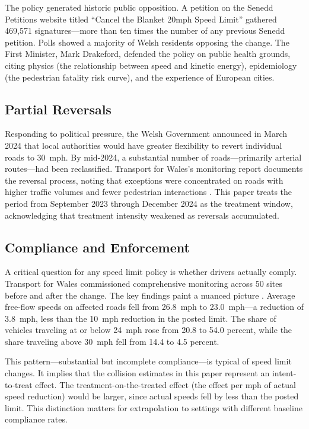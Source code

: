 \documentclass[12pt]{article}
\begin{document}
The policy generated historic public opposition. A petition on the Senedd Petitions website titled ``Cancel the Blanket 20mph Speed Limit'' gathered 469,571 signatures---more than ten times the number of any previous Senedd petition. Polls showed a majority of Welsh residents opposing the change. The First Minister, Mark Drakeford, defended the policy on public health grounds, citing physics (the relationship between speed and kinetic energy), epidemiology (the pedestrian fatality risk curve), and the experience of European cities.

\subsection{Partial Reversals}

Responding to political pressure, the Welsh Government announced in March 2024 that local authorities would have greater flexibility to revert individual roads to 30~mph. By mid-2024, a substantial number of roads---primarily arterial routes---had been reclassified. Transport for Wales's monitoring report documents the reversal process, noting that exceptions were concentrated on roads with higher traffic volumes and fewer pedestrian interactions \citep{tfw2025}. This paper treats the period from September 2023 through December 2024 as the treatment window, acknowledging that treatment intensity weakened as reversals accumulated.

\subsection{Compliance and Enforcement}

A critical question for any speed limit policy is whether drivers actually comply. Transport for Wales commissioned comprehensive monitoring across 50 sites before and after the change. The key findings paint a nuanced picture \citep{tfw2025}. Average free-flow speeds on affected roads fell from 26.8~mph to 23.0~mph---a reduction of 3.8~mph, less than the 10~mph reduction in the posted limit. The share of vehicles traveling at or below 24~mph rose from 20.8 to 54.0 percent, while the share traveling above 30~mph fell from 14.4 to 4.5 percent.

This pattern---substantial but incomplete compliance---is typical of speed limit changes. It implies that the collision estimates in this paper represent an intent-to-treat effect. The treatment-on-the-treated effect (the effect per mph of actual speed reduction) would be larger, since actual speeds fell by less than the posted limit. This distinction matters for extrapolation to settings with different baseline compliance rates.
\end{document}
